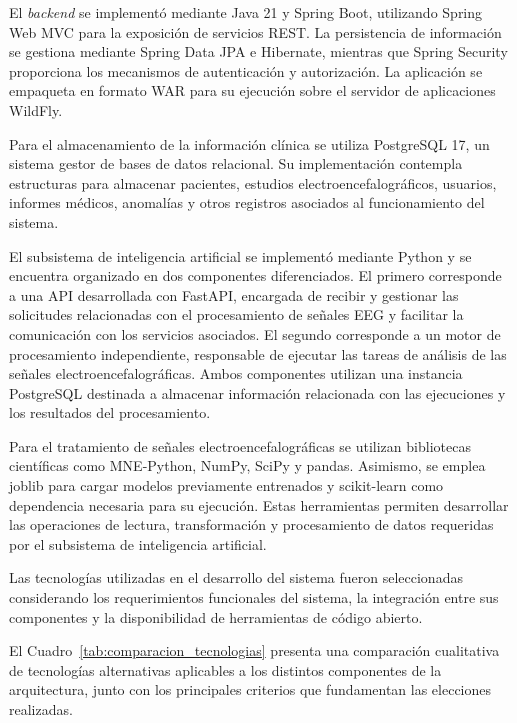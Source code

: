 El \textit{backend} se implementó mediante Java 21 y Spring Boot, utilizando
Spring Web MVC para la exposición de servicios REST. La persistencia
de información se gestiona mediante Spring Data JPA e Hibernate,
mientras que Spring Security proporciona los mecanismos de
autenticación y autorización. La aplicación se empaqueta en formato
WAR para su ejecución sobre el servidor de aplicaciones WildFly.

Para el almacenamiento de la información clínica se utiliza
PostgreSQL 17, un sistema gestor de bases de datos relacional. Su
implementación contempla estructuras para almacenar pacientes,
estudios electroencefalográficos, usuarios, informes médicos,
anomalías y otros registros asociados al funcionamiento del sistema.

El subsistema de inteligencia artificial se implementó mediante
Python y se encuentra organizado en dos componentes diferenciados.
El primero corresponde a una API desarrollada con FastAPI, encargada de recibir y gestionar las solicitudes relacionadas con el procesamiento de señales EEG y facilitar la comunicación con los servicios asociados. El segundo corresponde a un motor de procesamiento independiente, responsable de ejecutar las tareas de análisis de las señales electroencefalográficas. Ambos componentes utilizan una instancia PostgreSQL destinada a almacenar información relacionada con las ejecuciones y los resultados del procesamiento.


Para el tratamiento de señales electroencefalográficas se utilizan
bibliotecas científicas como MNE-Python, NumPy, SciPy y pandas.
Asimismo, se emplea joblib para cargar modelos previamente
entrenados y scikit-learn como dependencia necesaria para su
ejecución. Estas herramientas permiten desarrollar las operaciones
de lectura, transformación y procesamiento de datos requeridas
por el subsistema de inteligencia artificial.

Las tecnologías utilizadas en el desarrollo del sistema
fueron seleccionadas considerando los requerimientos
funcionales del sistema, la integración entre sus
componentes y la disponibilidad de herramientas
de código abierto.

El Cuadro~\ref{tab:comparacion_tecnologias} presenta
una comparación cualitativa de tecnologías alternativas
aplicables a los distintos componentes de la arquitectura,
junto con los principales criterios que fundamentan
las elecciones realizadas.

